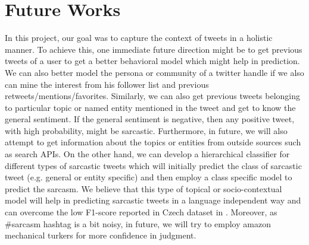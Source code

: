 \section{Future Works}
\label{sec:future}
In this project, our goal was to capture the context of tweets in a holistic manner. To achieve this, one immediate future direction might be to get previous tweets of a user to get a better behavioral model which might help in prediction. We can also better model the persona or community of a twitter handle if we also can mine the interest from his follower list and previous retweets/mentions/favorites. Similarly, we can also get previous tweets belonging to particular topic or named entity mentioned in the tweet and get to know the general sentiment. If the general sentiment is negative, then any positive tweet, with high probability, might be sarcastic. Furthermore, in future, we will also attempt to get information about the topics or entities from outside sources such as search APIs. On the other hand, we can develop a hierarchical classifier for different types of sarcastic tweets which will initially predict the class of sarcastic tweet (e.g. general or entity specific) and then employ a class specific model to predict the sarcasm. We believe that this type of topical or socio-contextual model will help in predicting sarcastic tweets in a language independent way and can overcome the low F1-score reported in Czech dataset in \cite{tomas14}. Moreover, as \#sarcasm hashtag is a bit noisy, in future, we will try to employ amazon mechanical turkers for more confidence in judgment.